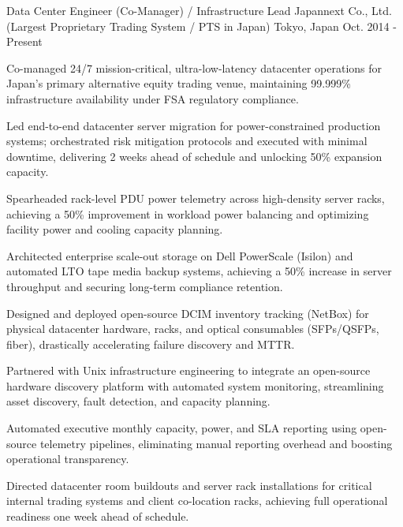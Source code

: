 

\begin{cventries}

  \cventry
    {Data Center Engineer (Co-Manager) / Infrastructure Lead} %
    {Japannext Co., Ltd. (Largest Proprietary Trading System / PTS in Japan)} %
    {Tokyo, Japan} %
    {Oct. 2014 - Present} %
    {
      \begin{cvitems} %
        \item {Co-managed 24/7 mission-critical, ultra-low-latency datacenter operations for Japan's primary alternative equity trading venue, maintaining 99.999\% infrastructure availability under FSA regulatory compliance.}
        \item {Led end-to-end datacenter server migration for power-constrained production systems; orchestrated risk mitigation protocols and executed with minimal downtime, delivering 2 weeks ahead of schedule and unlocking 50\% expansion capacity.}
        \item {Spearheaded rack-level PDU power telemetry across high-density server racks, achieving a 50\% improvement in workload power balancing and optimizing facility power and cooling capacity planning.}
        \item {Architected enterprise scale-out storage on Dell PowerScale (Isilon) and automated LTO tape media backup systems, achieving a 50\% increase in server throughput and securing long-term compliance retention.}
        \item {Designed and deployed open-source DCIM inventory tracking (NetBox) for physical datacenter hardware, racks, and optical consumables (SFPs/QSFPs, fiber), drastically accelerating failure discovery and MTTR.}
        \item {Partnered with Unix infrastructure engineering to integrate an open-source hardware discovery platform with automated system monitoring, streamlining asset discovery, fault detection, and capacity planning.}
        \item {Automated executive monthly capacity, power, and SLA reporting using open-source telemetry pipelines, eliminating manual reporting overhead and boosting operational transparency.}
        \item {Directed datacenter room buildouts and server rack installations for critical internal trading systems and client co-location racks, achieving full operational readiness one week ahead of schedule.}
      \end{cvitems}
    }


\end{cventries}
